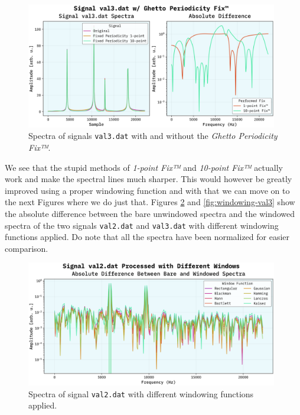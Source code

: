 \documentclass[10pt, titlepage, a4paper]{article}
\begin{document}
\begin{figure}[H]
    \centering
    \includegraphics[width=0.98\textwidth]{../SpectralAnalysis/Images/fixed-val3.dat.png}
    \caption{Spectra of signals \texttt{val3.dat} with and without the \textit{Ghetto Periodicity Fix™}.}
    \label{fig:periodicity-fix}
\end{figure}

We see that the stupid methods of \textit{1-point Fix™} and \textit{10-point Fix™} actually work and make the spectral lines 
much sharper. This would however be greatly improved using a proper windowing function and with that we can move on to the next Figures 
where we do just that. Figures \ref{fig:windowing-val2} and \ref{fig:windowing-val3} show the absolute difference between the bare 
unwindowed spectra and the windowed spectra of the two signals \texttt{val2.dat} and \texttt{val3.dat} with different windowing functions applied.
Do note that all the spectra have been normalized for easier comparison.

\begin{figure}[H]
    \centering
    \includegraphics[width=0.98\textwidth]{../SpectralAnalysis/Images/window-spectra-val2.dat.png}
    \caption{Spectra of signal \texttt{val2.dat} with different windowing functions applied.}
    \label{fig:windowing-val2}
\end{figure}
\end{document}
